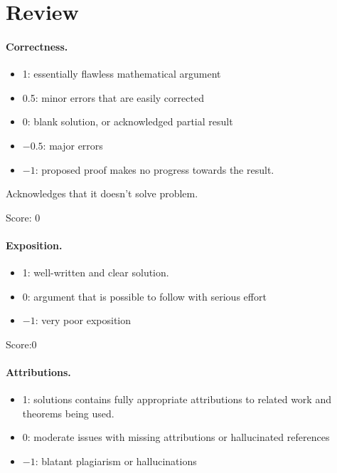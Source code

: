 \documentclass[11pt]{article}
\theoremstyle{definition}
\theoremstyle{remark}
\begin{document}
\maketitle

\section{Review}

\paragraph{Correctness.}
\begin{itemize}
	\item  1: essentially flawless mathematical argument
	\item  0.5: minor errors that are easily corrected
	\item  0: blank solution, or acknowledged partial result
	\item  $-0.5$: major errors
	\item  $-1$: proposed proof makes no progress towards the result.
\end{itemize}
Acknowledges that it doesn't solve problem.

\noindent Score: 0

\paragraph{Exposition.}
\begin{itemize}
	\item  1: well-written and clear solution.
	\item  0: argument that is possible to follow with serious effort
	\item  $-1$: very poor exposition
\end{itemize}

\noindent Score:0

\paragraph{Attributions.}
\begin{itemize}
	\item  1: solutions contains fully appropriate attributions
		to related work and theorems being used.
	\item  0: moderate issues with missing attributions or hallucinated references
	\item  $-1$: blatant plagiarism or hallucinations
\end{itemize}
\end{document}
